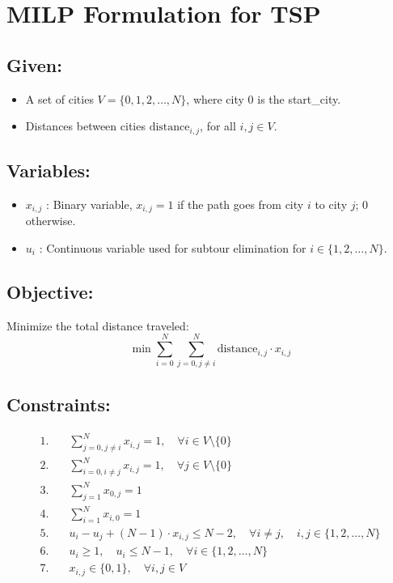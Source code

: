 \documentclass{article}
\begin{document}
\section*{MILP Formulation for TSP}

\subsection*{Given:}
\begin{itemize}
    \item A set of cities \( V = \{0, 1, 2, \ldots, N\} \), where city 0 is the start_city.
    \item Distances between cities \( \text{distance}_{i,j} \), for all \( i, j \in V \).
\end{itemize}

\subsection*{Variables:}
\begin{itemize}
    \item \( x_{i,j} \) : Binary variable, \( x_{i,j} = 1 \) if the path goes from city \( i \) to city \( j \); 0 otherwise.
    \item \( u_i \) : Continuous variable used for subtour elimination for \( i \in \{1, 2, \ldots, N\} \).
\end{itemize}

\subsection*{Objective:}
Minimize the total distance traveled:
\[
\min \sum_{i=0}^{N} \sum_{j=0, j \neq i}^{N} \text{distance}_{i,j} \cdot x_{i,j}
\]

\subsection*{Constraints:}
\begin{align}
1. & \quad \sum_{j=0, j \neq i}^{N} x_{i,j} = 1, \quad \forall i \in V \setminus \{0\} \\
2. & \quad \sum_{i=0, i \neq j}^{N} x_{i,j} = 1, \quad \forall j \in V \setminus \{0\} \\
3. & \quad \sum_{j=1}^{N} x_{0,j} = 1 \\
4. & \quad \sum_{i=1}^{N} x_{i,0} = 1 \\
5. & \quad u_i - u_j + (N-1) \cdot x_{i,j} \leq N-2, \quad \forall i \neq j, \quad i, j \in \{1, 2, \ldots, N\} \\
6. & \quad u_i \geq 1, \quad u_i \leq N-1, \quad \forall i \in \{1, 2, \ldots, N\} \\
7. & \quad x_{i,j} \in \{0, 1\}, \quad \forall i, j \in V
\end{align}
\end{document}
